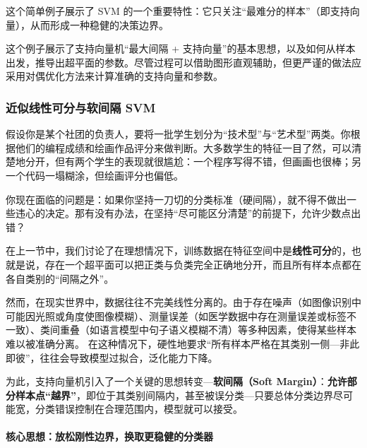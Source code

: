 这个简单例子展示了 SVM 的一个重要特性：它只关注“最难分的样本”（即支持向量），从而形成一种稳健的决策边界。

这个例子展示了支持向量机“最大间隔 + 支持向量”的基本思想，以及如何从样本出发，推导出超平面的参数。尽管过程可以借助图形直观辅助，但更严谨的做法应采用对偶优化方法来计算准确的支持向量和参数。

\subsubsection{近似线性可分与软间隔 SVM}

假设你是某个社团的负责人，要将一批学生划分为“技术型”与“艺术型”两类。你根据他们的编程成绩和绘画作品评分来做判断。大多数学生的特征一目了然，可以清楚地分开，但有两个学生的表现就很尴尬：一个程序写得不错，但画画也很棒；另一个代码一塌糊涂，但绘画评分也偏低。

你现在面临的问题是：如果你坚持一刀切的分类标准（硬间隔），就不得不做出一些违心的决定。那有没有办法，在坚持“尽可能区分清楚”的前提下，允许少数点出错？

在上一节中，我们讨论了在理想情况下，训练数据在特征空间中是\textbf{线性可分}的，也就是说，存在一个超平面可以把正类与负类完全正确地分开，而且所有样本点都在各自类别的“间隔之外”。

然而，在现实世界中，数据往往不完美线性分离的。由于存在噪声（如图像识别中可能因光照或角度使图像模糊）、测量误差（如医学数据中存在测量误差或标签不一致）、类间重叠（如语言模型中句子语义模糊不清）等多种因素，使得某些样本难以被准确分离。
在这种情况下，硬性地要求“所有样本严格在其类别一侧---非此即彼”，往往会导致模型过拟合，泛化能力下降。

为此，支持向量机引入了一个关键的思想转变---\textbf{软间隔（Soft Margin）}：\textbf{允许部分样本点“越界”}，即位于其类别间隔内，甚至被误分类---只要总体分类边界尽可能宽，分类错误控制在合理范围内，模型就可以接受。

\paragraph{核心思想：放松刚性边界，换取更稳健的分类器}

